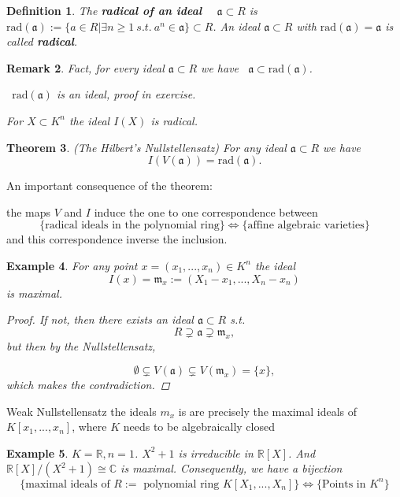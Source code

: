 \documentclass[11pt]{article}
\newtheorem{thm}{Theorem}[section]
\newtheorem{dfn}[thm]{Definition}
\newtheorem{rmk}[thm]{Remark}
\newtheorem{ex}[thm]{Example}
\newcommand{\reals}{\mathbb R}
\newcommand{\cplx}{\mathbb C}
\newcommand{\sca}{{\mathfrak a}}
\newcommand{\scm}{{\mathfrak m}}
\begin{document}
\begin{dfn}
The \textbf{radical of an ideal}   $\sca\subset R$ is 
 $\text{rad}(\sca):=\{a\in R| \exists n\geq1\  s.t.\  a^n \in \sca\} \subset R$.
An ideal $\sca \subset R$ with $\text{rad}(\sca)=\sca$ is  called \textbf{radical}.
\end{dfn}

\begin{rmk}
Fact, 
for every ideal $\sca \subset R$ we have  $\sca\subset \text{rad}(\sca)$.

 $\text{rad}(\sca)$ is an ideal, proof in exercise.

For $X\subset K^n$ the ideal $I(X)$ is radical. 

\end{rmk}

\begin{thm}
(The Hilbert's Nullstellensatz)
For any ideal $\sca \subset R $ we have
$$I(V(\sca))=\text{rad}(\sca).$$
\end{thm}

An important consequence of the theorem:

the maps $V$ and $I$ induce the one to one correspondence between
$$
\{\text{radical ideals in the polynomial ring}\}\Longleftrightarrow                   \{\text{affine algebraic varieties}\}
$$
and this correspondence inverse the inclusion.

\begin{ex}
For any point $x=(x_1,...,x_n) \in K^n$ the ideal 
$$
I({x})=\scm_x:=(X_1-x_1,...,X_n-x_n)
$$
is maximal.
\begin{proof}

 If not, then there exists an ideal $\sca \subset R$
s.t. 
\begin{equation*}
R\supsetneq \sca \supsetneq \scm_x,
\end{equation*}
but then by the Nullstellensatz,

\begin{equation*}
\emptyset\subsetneq V(\sca) \subsetneq V(\scm_x)=\{x\},
\end{equation*}
which makes the contradiction.
\end{proof}
\end{ex}

Weak Nullstellensatz the ideals $m_x$ is are precisely the maximal ideals of $K[x_1,...,x_n]$, where $K$ needs to be algebraically closed
\begin{ex}
$K=\reals, n=1$.
$X^2+1$ is irreducible in $\reals[X]$.
And $\reals[X]/(X^2+1) \cong \cplx$ is maximal.
Consequently, we have a bijection
$$
\{\text{maximal ideals of $R:=$ polynomial ring }K[X_1,...,X_n]\}
\Longleftrightarrow\{\text{Points in } K^n\}
$$
\end{ex}
\end{document}
